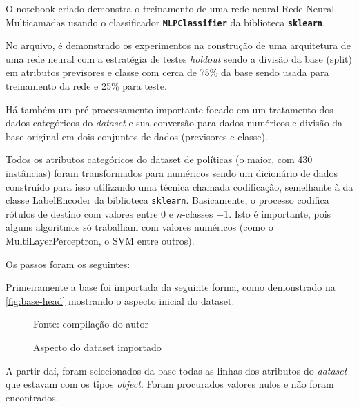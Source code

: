 O notebook criado demonstra o treinamento de uma rede neural Rede Neural Multicamadas usando o classificador \texttt{\textbf{MLPClassifier}} da biblioteca \texttt{\textbf{sklearn}}.

No arquivo, é demonstrado os experimentos na construção de uma arquitetura de uma rede neural com a estratégia de testes \textit{holdout} sendo a divisão da base (split) em atributos previsores e classe com cerca de 75\% da base sendo usada para treinamento da rede e 25\% para teste.

Há também um pré-processamento importante focado em um tratamento dos dados categóricos do \textit{dataset} e sua conversão para dados numéricos e divisão da base original em dois conjuntos de dados (previsores e classe).

Todos os atributos categóricos do dataset de políticas (o maior, com 430 instâncias) foram transformados para numéricos sendo um dicionário de dados construído para isso utilizando uma técnica chamada codificação, semelhante à da classe LabelEncoder da biblioteca \texttt{sklearn}. Basicamente, o processo codifica rótulos de destino com valores entre $0$ e $n$-classes $- 1$. Isto é importante, pois alguns algoritmos só trabalham com valores numéricos (como o MultiLayerPerceptron, o SVM entre outros).

Os passos foram os seguintes:

Primeiramente a base foi importada da seguinte forma, como demonstrado na \autoref{fig:base-head} mostrando o aspecto inicial do dataset.

\begin{figure}[h!]
	\centering
	\caption{Aspecto do dataset importado}
	
	\label{fig:base-head}
	{\scriptsize Fonte: compilação do autor}
\end{figure}

A partir daí, foram selecionados da base todas as linhas dos atributos do \textit{dataset} que estavam com os tipos \textit{object}. Foram procurados valores nulos e não foram encontrados. 

